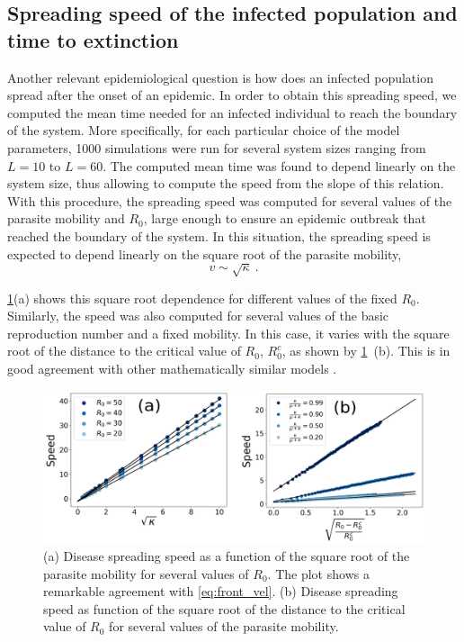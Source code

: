 \subsection{Spreading speed of the infected population and time to extinction}

Another relevant epidemiological question is how does an infected
population spread after the onset of an epidemic. In order to obtain this
spreading speed, we computed the mean time needed for an infected individual to
reach the boundary of the system. More specifically, for each particular choice
of the model parameters, 1000 simulations were run for several system sizes
ranging from $L=10$ to $L=60$. The computed mean time was found to depend
linearly on the system size, thus allowing to compute the speed from the
slope of this relation. With this procedure, the spreading speed was computed
for several values of the parasite mobility and $R_0$, large enough to ensure
an epidemic outbreak that reached the boundary of the system. In this
situation, the spreading speed is expected to depend linearly on the square
root of the parasite mobility,
\begin{equation}\label{eq:front_vel}
    v\sim\sqrt{\kappa} \ .
\end{equation}

\cref{fig:front_velocity}(a) shows this square root dependence for
different values of the fixed $R_0$. Similarly, the speed was also computed for
several values of the basic reproduction number and a fixed mobility. In this
case, it varies with the square root of the distance to the critical value of
$R_0$, $R_0^c$, as shown by
\cref{fig:front_velocity}~\textcolor{ref_color}{(b)}. This is in good
agreement with other mathematically similar models \cite{Bertuzzo2010}.

\begin{figure}[H]
    \centering
    \includegraphics[width=1\textwidth]{Figures/Front_velocity.png}
    \caption[Analysis of the spreading speed of the infected population]{(a)
        Disease spreading speed as a function of the square root of the
        parasite
        mobility for several values of $R_0$. The plot shows a remarkable
        agreement with \cref{eq:front_vel}. (b) Disease spreading speed as
        function of the square root of the distance to the critical value of
        $R_0$ for several values of the parasite mobility.}
    \label{fig:front_velocity}
\end{figure}

